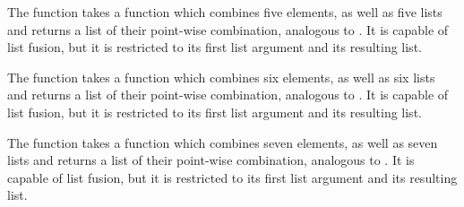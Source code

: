\begin{haddockdesc}
\item[\begin{tabular}{@{}l}
zipWith5 :: (a -> b -> c -> d -> e -> f) -> {\char 91}a{\char 93} -> {\char 91}b{\char 93} -> {\char 91}c{\char 93} -> {\char 91}d{\char 93} -> {\char 91}e{\char 93} -> {\char 91}f{\char 93}
\end{tabular}]
{\haddockbegindoc
The  function takes a function which combines five
 elements, as well as five lists and returns a list of their point-wise
 combination, analogous to .
 It is capable of list fusion, but it is restricted to its
 first list argument and its resulting list.\par}
\end{haddockdesc}
\begin{haddockdesc}
\item[\begin{tabular}{@{}l}
zipWith6 :: (a -> b -> c -> d -> e -> f -> g)\\\ \ \ \ \ \ \ \ \ \ \ \ -> {\char 91}a{\char 93} -> {\char 91}b{\char 93} -> {\char 91}c{\char 93} -> {\char 91}d{\char 93} -> {\char 91}e{\char 93} -> {\char 91}f{\char 93} -> {\char 91}g{\char 93}
\end{tabular}]
{\haddockbegindoc
The  function takes a function which combines six
 elements, as well as six lists and returns a list of their point-wise
 combination, analogous to .
 It is capable of list fusion, but it is restricted to its
 first list argument and its resulting list.\par}
\end{haddockdesc}
\begin{haddockdesc}
\item[\begin{tabular}{@{}l}
zipWith7 :: (a -> b -> c -> d -> e -> f -> g -> h)\\\ \ \ \ \ \ \ \ \ \ \ \ -> {\char 91}a{\char 93} -> {\char 91}b{\char 93} -> {\char 91}c{\char 93} -> {\char 91}d{\char 93} -> {\char 91}e{\char 93} -> {\char 91}f{\char 93} -> {\char 91}g{\char 93} -> {\char 91}h{\char 93}
\end{tabular}]
{\haddockbegindoc
The  function takes a function which combines seven
 elements, as well as seven lists and returns a list of their point-wise
 combination, analogous to .
 It is capable of list fusion, but it is restricted to its
 first list argument and its resulting list.\par}
\end{haddockdesc}
